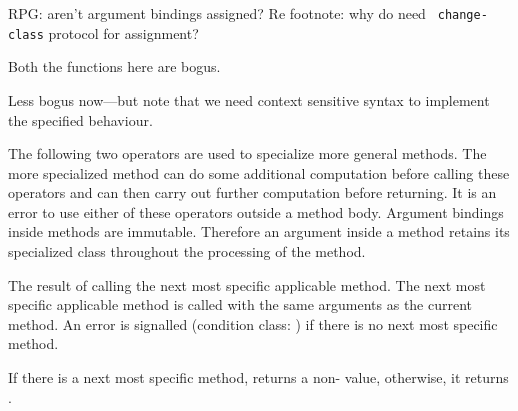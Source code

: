 %
\begin{optPrivate}
    RPG: aren't argument bindings assigned?  Re footnote: why do need {\tt
        change-class} protocol for assignment?

    Both the functions here are bogus.

    Less bogus now---but note that we need context sensitive syntax to implement
    the specified behaviour.
\end{optPrivate}
%
\begin{optDefinition}
The following two operators are used to specialize more general methods.  The
more specialized method can do some additional computation before calling these
operators and can then carry out further computation before returning.  It is an
error to use either of these operators outside a method body.  Argument bindings
inside methods are immutable.  Therefore an
argument inside a method retains its specialized class throughout the processing
of the method.

\Signature
{}%
%
%
\result%
The result of calling the next most specific applicable method.
%
\remarks%
The next most specific applicable method is called with the same
arguments as the current method.  An error is signalled (condition
class: ) if there
is no next most specific method.

\Signature
{}%
%
%
\result%
If there is a next most specific method,  returns a
non-\nil{}\/ value, otherwise, it returns \nil{}.
%
\end{optDefinition}


